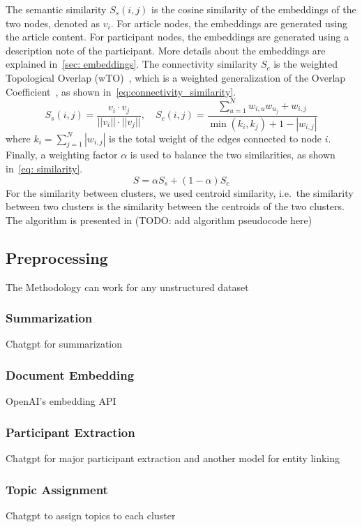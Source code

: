 The semantic similarity $S_s(i, j)$ is the cosine similarity of the embeddings of the two nodes, denoted as $v_i$.
For article nodes, the embeddings are generated using the article content.
For participant nodes, the embeddings are generated using a description note of the participant.
More details about the embeddings are explained in~\autoref{sec: embeddings}.
The connectivity similarity $S_c$ is the weighted Topological Overlap (wTO)~\cite{gysi2018wto},
which is a weighted generalization of the Overlap Coefficient~\cite{vijaymeena2016survey}, as shown in~\autoref{eq:connectivity_similarity}.
\begin{equation}\label{eq:connectivity_similarity}
    S_s(i, j) = \frac{v_i \cdot v_j}{||v_i|| \cdot ||v_j||}, \quad
    S_c(i, j) = \frac{\sum_{u=1}^N{w_{i,u}w_{u_j}} + w_{i,j}}{\min(k_i, k_j) + 1 - |w_{i,j}|}
\end{equation}
where $k_i = \sum_{j=1}^N |w_{i,j}|$ is the total weight of the edges connected to node $i$.
Finally, a weighting factor $\alpha$ is used to balance the two similarities, as shown in~\autoref{eq: similarity}.
\begin{equation}\label{eq: similarity}
    S = \alpha S_s + (1-\alpha) S_c
\end{equation}
For the similarity between clusters, we used centroid similarity, i.e.\ the similarity between two clusters is the similarity between the centroids of the two clusters.
The algorithm is presented in (TODO: add algorithm pseudocode here)



\subsection{Preprocessing}
The Methodology can work for any unstructured dataset
\subsubsection{Summarization}
Chatgpt for summarization
\subsubsection{Document Embedding}\label{sec: embeddings}
OpenAI's embedding API
\subsubsection{Participant Extraction}\label{sec: participant_extraction}
Chatgpt for major participant extraction and another model for entity linking

\subsubsection{Topic Assignment}\label{sec: topic_assignment}
Chatgpt to assign topics to each cluster